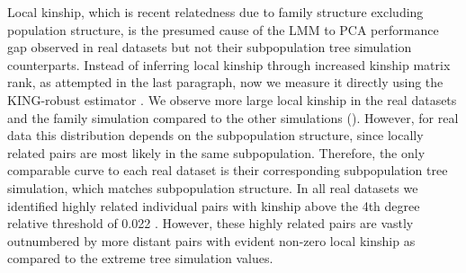 \documentclass[9pt,lineno]{elife}
\begin{document}
Local kinship, which is recent relatedness due to family structure excluding population structure, is the presumed cause of the LMM to PCA performance gap observed in real datasets but not their subpopulation tree simulation counterparts.
Instead of inferring local kinship through increased kinship matrix rank, as attempted in the last paragraph, now we measure it directly using the KING-robust estimator \citep{manichaikul_robust_2010}.
We observe more large local kinship in the real datasets and the family simulation compared to the other simulations ().
However, for real data this distribution depends on the subpopulation structure, since locally related pairs are most likely in the same subpopulation.
Therefore, the only comparable curve to each real dataset is their corresponding subpopulation tree simulation, which matches subpopulation structure.
In all real datasets we identified highly related individual pairs with kinship above the 4th degree relative threshold of 0.022 \citep{manichaikul_robust_2010, conomos_model-free_2016}.
However, these highly related pairs are vastly outnumbered by more distant pairs with evident non-zero local kinship as compared to the extreme tree simulation values.
\end{document}
